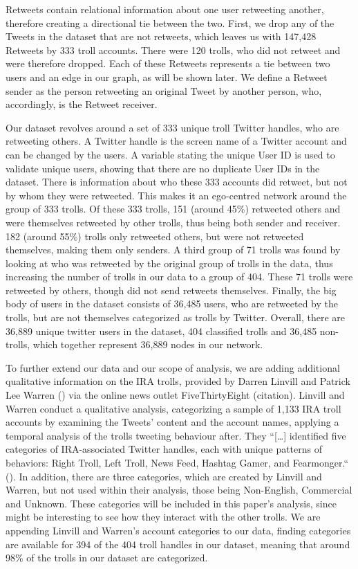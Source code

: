 \documentclass[12pt, titlepage=true, toc=bib]{scrartcl}
\begin{document}
Retweets contain relational information about one user retweeting another, therefore creating a directional tie between the two. First, we drop any of the Tweets in the dataset that are not retweets, which leaves us with 147,428 Retweets by 333 troll accounts. There were 120 trolls, who did not retweet and were therefore dropped. Each of these Retweets represents a tie between two users and an edge in our graph, as will be shown later. We define a Retweet sender as the person retweeting an original Tweet by another person, who, accordingly, is the Retweet receiver.
 
Our dataset revolves around a set of 333 unique troll Twitter handles, who are retweeting others. A Twitter handle is the screen name of a Twitter account and can be changed by the users. A variable stating the unique User ID is used to validate unique users, showing that there are no duplicate User IDs in the dataset. There is information about who these 333 accounts did retweet, but not by whom they were retweeted. This makes it an ego-centred network around the group of 333 trolls. Of these 333 trolls, 151 (around 45\%) retweeted others and were themselves retweeted by other trolls, thus being both sender and receiver. 182 (around 55\%) trolls only retweeted others, but were not retweeted themselves, making them only senders. A third group of 71 trolls was found by looking at who was retweeted by the original group of trolls in the data, thus increasing the number of trolls in our data to a group of 404. These 71 trolls were retweeted by others, though did not send retweets themselves. Finally, the big body of users in the dataset consists of 36,485 users, who are retweeted by the trolls, but are not themselves categorized as trolls by Twitter. Overall, there are 36,889 unique twitter users in the dataset, 404 classified trolls and 36,485 non-trolls, which together represent 36,889 nodes in our network.

To further extend our data and our scope of analysis, we are adding additional qualitative information on the IRA trolls, provided by Darren Linvill and Patrick Lee Warren (\cite*{linvill_troll_nodate}) via the online news outlet FiveThirtyEight (citation). Linvill and Warren conduct a qualitative analysis, categorizing a sample of 1,133 IRA troll accounts by examining the Tweets’ content and the account names, applying a temporal analysis of the trolls tweeting behaviour after. They “[…] identified five categories of IRA-associated Twitter handles, each with unique patterns of behaviors: Right Troll, Left Troll, News Feed, Hashtag Gamer, and Fearmonger.“ (\cite[6]{linvill_troll_nodate}). In addition, there are three categories, which are created by Linvill and Warren, but not used within their analysis, those being Non-English, Commercial and Unknown. These categories will be included in this paper’s analysis, since might be interesting to see how they interact with the other trolls. We are appending Linvill and Warren’s account categories to our data, finding categories are available for 394 of the 404 troll handles in our dataset, meaning that around 98\% of the trolls in our dataset are categorized.
 
\end{document}
